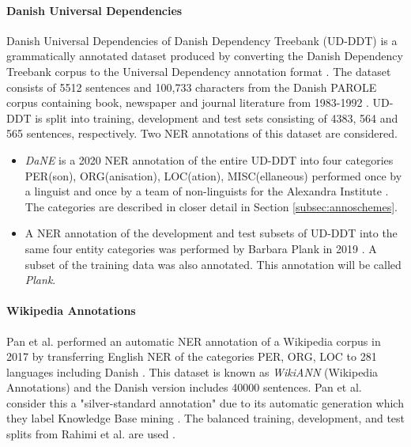 \documentclass[main.tex]{subfiles}
\begin{document}
\paragraph{Danish Universal Dependencies}
Danish Universal Dependencies of Danish Dependency Treebank (UD-DDT) is a grammatically annotated dataset produced by converting the Danish Dependency Treebank corpus \cite{kromann2003ddt} to the Universal Dependency annotation format \cite{johann2015udddt}.
The dataset consists of 5512 sentences and 100,733 characters from the Danish PAROLE corpus containing book, newspaper and journal literature from 1983-1992 \cite{christensen1998parole}.
UD-DDT is split into training, development and test sets consisting of 4383, 564 and 565 sentences, respectively.
Two NER annotations of this dataset are considered.
\begin{itemize}
    \item \emph{DaNE} is a 2020 NER annotation of the entire UD-DDT into four categories PER(son), ORG(anisation), LOC(ation), MISC(ellaneous) performed once by a linguist and once by a team of non-linguists for the Alexandra Institute \cite[Sec. 4]{hvingelby2020dane}.
    The categories are described in closer detail in Section \ref{subsec:annoschemes}.
    \item A NER annotation of the development and test subsets of UD-DDT into the same four entity categories was performed by Barbara Plank in 2019 \cite{plank2019neural}.
    A subset of the training data was also annotated.
    This annotation will be called \emph{Plank}.
\end{itemize}

\paragraph{Wikipedia Annotations}
Pan et al. performed an automatic NER annotation of a Wikipedia corpus in 2017 by transferring English NER of the categories PER, ORG, LOC to 281 languages including Danish \cite{pan2017wikiann}.
This dataset is known as \emph{WikiANN} (Wikipedia Annotations) and the Danish version includes 40000 sentences.
Pan et al. consider this a "silver-standard annotation" due to its automatic generation which they label Knowledge Base mining \cite[1946]{pan2017wikiann}.
The balanced training, development, and test splits from Rahimi et al. are used \cite{rahimi2019transfer}.
\end{document}
